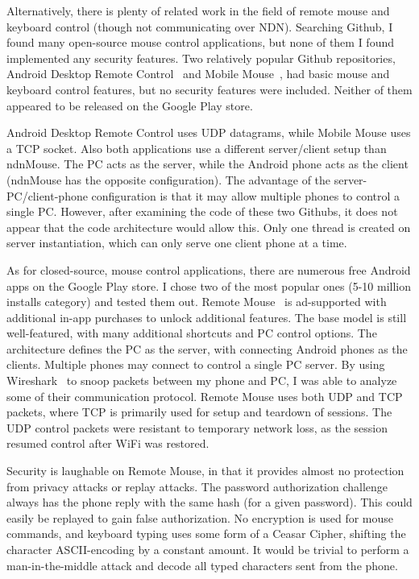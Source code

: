 \documentclass{sig-alternate}
\renewcommand\_{\textunderscore\allowbreak}  %
\begin{document}
Alternatively, there is plenty of related work in the field of remote mouse and keyboard control (though not communicating over NDN). Searching Github, I found many open-source mouse control applications, but none of them I found implemented any security features. Two relatively popular Github repositories, Android Desktop Remote Control~\cite{justintaylor} and Mobile Mouse~\cite{mobilemouse}, had basic mouse and keyboard control features, but no security features were included. Neither of them appeared to be released on the Google Play store. 

Android Desktop Remote Control uses UDP datagrams, while Mobile Mouse uses a TCP socket. Also both applications use a different server/client setup than ndnMouse. The PC acts as the server, while the Android phone acts as the client (ndnMouse has the opposite configuration). The advantage of the server-PC/client-phone configuration is that it may allow multiple phones to control a single PC. However, after examining the code of these two Githubs, it does not appear that the code architecture would allow this. Only one thread is created on server instantiation, which can only serve one client phone at a time.

As for closed-source, mouse control applications, there are numerous free Android apps on the Google Play store. I chose two of the most popular ones (5-10 million installs category) and tested them out. Remote Mouse~\cite{remotemouse} is ad-supported with additional in-app purchases to unlock additional features. The base model is still well-featured, with many additional shortcuts and PC control options. The architecture defines the PC as the server, with connecting Android phones as the clients. Multiple phones may connect to control a single PC server. By using Wireshark~\cite{wireshark} to snoop packets between my phone and PC, I was able to analyze some of their communication protocol. Remote Mouse uses both UDP and TCP packets, where TCP is primarily used for setup and teardown of sessions. The UDP control packets were resistant to temporary network loss, as the session resumed control after WiFi was restored. 

Security is laughable on Remote Mouse, in that it provides almost no protection from privacy attacks or replay attacks. The password authorization challenge always has the phone reply with the same hash (for a given password). This could easily be replayed to gain false authorization. No encryption is used for mouse commands, and keyboard typing uses some form of a Ceasar Cipher, shifting the character ASCII-encoding by a constant amount. It would be trivial to perform a man-in-the-middle attack and decode all typed characters sent from the phone.
\end{document}
